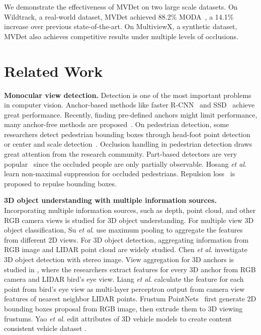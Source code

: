 \documentclass[runningheads]{llncs}
\newcommand{\etal}{\textit{et al}. }
\begin{document}
We demonstrate the effectiveness of MVDet on two large scale datasets. On Wildtrack, a real-world dataset, MVDet achieved 88.2\% MODA~\cite{kasturi2008framework}, a 14.1\% increase over previous state-of-the-art. On MultiviewX, a synthetic dataset, MVDet also achieves competitive results under multiple levels of occlusions. 




\section{Related Work}
\label{sec:related}

\textbf{Monocular view detection.} 
Detection is one of the most important problems in computer vision. 
Anchor-based methods like faster R-CNN~\cite{ren2015faster} and SSD~\cite{liu2016ssd} achieve great performance. Recently, finding pre-defined anchors might limit performance, many anchor-free methods are proposed~\cite{zhu2019feature,tian2019fcos,kong2019foveabox,yang2018metaanchor,duan2019centernet,law2018cornernet}.
On pedestrian detection, 
some researchers detect pedestrian bounding boxes through head-foot point detection~\cite{song2018small} or center and scale detection~\cite{liu2019high}. Occlusion handling in pedestrian detection draws great attention from the research community. 
Part-based detectors are very popular~\cite{ouyang2015partial,tian2015deep,noh2018improving,zhang2018occlusion} since the occluded people are only partially observable. 
Hosang \etal \cite{hosang2017learning} learn non-maximal suppression for occluded pedestrians. 
Repulsion loss~\cite{wang2018repulsion} is proposed to repulse bounding boxes. 

\textbf{3D object understanding with multiple information sources.} 
Incorporating multiple information sources, such as depth, point cloud, and other RGB camera views is studied for 3D object understanding. 
For multiple view 3D object classification, Su \etal \cite{su2015multi} use maximum pooling to aggregate the features from different 2D views. 
For 3D object detection, aggregating information from RGB image and LIDAR point cloud are widely studied. Chen \etal \cite{chen20153d} investigate 3D object detection with stereo image. 
View aggregation for 3D anchors is studied in \cite{ku2018joint}, where the researchers extract features for every 3D anchor from RGB camera and LIDAR bird's eye view. Liang \etal \cite{liang2018deep} calculate the feature for each point from bird's eye view as multi-layer perceptron output from camera view features of  nearest neighbor LIDAR points. Frustum PointNets~\cite{qi2018frustum} first generate 2D bounding boxes proposal from RGB image, then extrude them to 3D viewing frustums. 
Yao \etal edit attributes of 3D vehicle models to create content consistent vehicle dataset \cite{yao2019simulating}.
\end{document}
